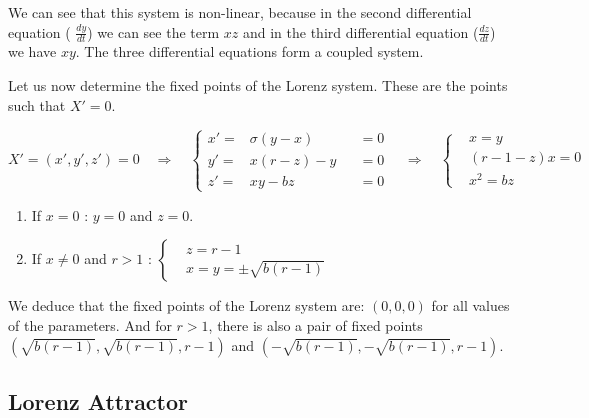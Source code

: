 \documentclass[12pt]{article}
\begin{document}
	\noindent We can see that this system is non-linear, because in the second differential equation ( $\frac{dy}{dt}$) we can see the term $xz$ and in the third differential equation ($\frac{dz}{dt}$) we have $xy$. The three differential equations form a coupled system. 
	
	\noindent Let us now determine the fixed points of the Lorenz system. These are the points such that $X'=0$. 
	
	$$
	X'=(x',y',z')=0
	\quad \Rightarrow \quad 
	\left\{\begin{aligned}
		x'=&\sigma(y-x) &&=0 \\
		y'=&x(r-z)-y  &&=0\\
		z'=&xy-bz &&=0
	\end{aligned}\right. 
	\quad \Rightarrow \quad 
	\left\{\begin{aligned}
		&x=y \\
		&(r-1-z)x=0\\
		&x^2=bz
	\end{aligned}\right.
	$$
	
	\begin{enumerate}[label=\textbullet]
		\item If $x=0$ : \quad  $y=0$ and $z=0$.
		\item If $x\ne 0$ and $r>1$ : \quad $\left\{\begin{aligned}
			&z=r-1\\
			&x=y=\pm\sqrt{b(r-1)}
		\end{aligned}\right.
		$
	\end{enumerate}
	
	\noindent We deduce that the fixed points of the Lorenz system are: $(0,0,0)$ for all values of the parameters. And for $r>1$, there is also a pair of fixed points $(\sqrt{b(r-1)},\sqrt{b(r-1)},r-1)$ and $(-\sqrt{b(r-1)},-\sqrt{b(r-1)},r-1)$.
	
	\subsection{Lorenz Attractor}
	
\end{document}
